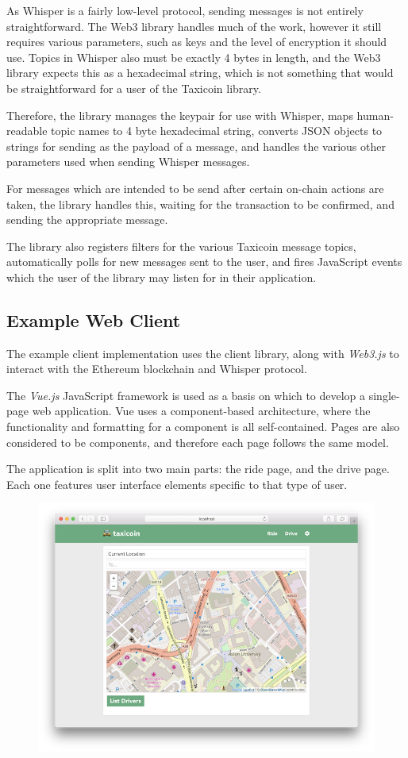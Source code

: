 As Whisper is a fairly low-level protocol, sending messages is not entirely straightforward. The Web3 library handles much of the work, however it still requires various parameters, such as keys and the level of encryption it should use. Topics in Whisper also must be exactly 4 bytes in length, and the Web3 library expects this as a hexadecimal string, which is not something that would be straightforward for a user of the Taxicoin library.

Therefore, the library manages the keypair for use with Whisper, maps human-readable topic names to 4 byte hexadecimal string, converts JSON objects to strings for sending as the payload of a message, and handles the various other parameters used when sending Whisper messages.

For messages which are intended to be send after certain on-chain actions are taken, the library handles this, waiting for the transaction to be confirmed, and sending the appropriate message.

The library also registers filters for the various Taxicoin message topics, automatically polls for new messages sent to the user, and fires JavaScript events which the user of the library may listen for in their application.

\subsection{Example Web Client}

The example client implementation uses the client library, along with \textit{Web3.js} to interact with the Ethereum blockchain and Whisper protocol.

The \textit{Vue.js} JavaScript framework is used as a basis on which to develop a single-page web application. Vue uses a component-based architecture, where the functionality and formatting for a component is all self-contained. Pages are also considered to be components, and therefore each page follows the same model.

The application is split into two main parts: the ride page, and the drive page. Each one features user interface elements specific to that type of user.

\begin{figure}[h]
	\centering
	\includegraphics[width=12cm]{res/webapp.png}
\end{figure}

